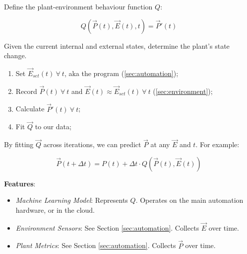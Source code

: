 \documentclass{report}
\begin{document}
Define the plant-environment behaviour function $Q$: 

$$Q(\vec P(t), \vec E(t), t)=\vec P'(t)$$ 

Given the current internal and external states, determine the plant's state change.

\begin{enumerate}
    \item Set $\vec E_{set}(t)~\forall~ t$, aka the program (\ref{sec:automation});
    \item Record $\vec P(t)~\forall~ t$ and $\vec E(t)\approx \vec E_{set}(t)~\forall~ t$ (\ref{sec:environment});
    \item Calculate $\vec P'(t)~\forall~ t$;
    \item Fit $\vec Q$ to our data;
\end{enumerate}

By fitting $\vec Q$ across iterations, we can predict $\vec P$ at any $\vec E$ and $t$. For example:

$$\vec P(t+\Delta t)=P(t)+\Delta t\cdot Q(\vec P(t),\vec E(t))$$

\textbf{Features}:
\begin{itemize}
    \item \textit{Machine Learning Model}: Represents $Q$. Operates on the main automation hardware, or in the cloud.
    \item \textit{Environment Sensors}: See Section \ref{sec:automation}. Collects $\vec E$ over time.
    \item \textit{Plant Metrics}: See Section \ref{sec:automation}. Collects $\vec P$ over time.
\end{itemize}

\newpage



\end{document}
